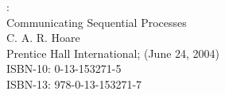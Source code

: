 \documentclass[a4paper,12pt]{article}
\begin{document}
\begin{thebibliography}{99}

:\\
Communicating Sequential Processes\\
C. A. R. Hoare\\
Prentice Hall International; (June 24, 2004)\\
ISBN-10: 0-13-153271-5\\
ISBN-13: 978-0-13-153271-7

\end{thebibliography}
\end{document}
